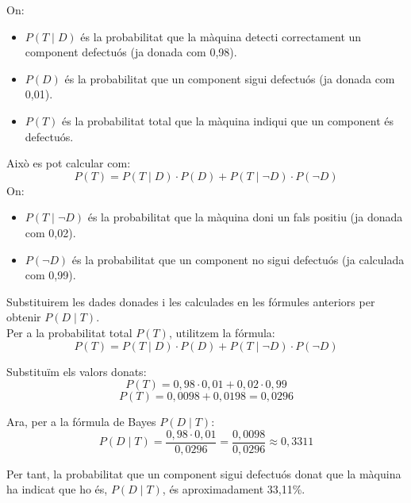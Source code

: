 \documentclass[12pt]{article}
\begin{document}
\begin{exemple} [title=] \noindent On:

\begin{itemize}
    \item $P(T \mid D)$ és la probabilitat que la màquina detecti correctament un component defectuós (ja donada com 0,98).
    \item $P(D)$ és la probabilitat que un component sigui defectuós (ja donada com 0,01).
    \item $P(T)$ és la probabilitat total que la màquina indiqui que un component és defectuós. 
\end{itemize}   
Això es pot calcular com:
    \[
    P(T) = P(T \mid D) \cdot P(D) + P(T \mid \neg D) \cdot P(\neg D)
    \]
    On:
    \begin{itemize}
    \item $P(T \mid \neg D)$ és la probabilitat que la màquina doni un fals positiu (ja donada com 0,02).
    \item $P(\neg D)$ és la probabilitat que un component no sigui defectuós (ja calculada com 0,99).
\end{itemize}

Substituirem les dades donades i les calculades en les fórmules anteriors per obtenir $P(D \mid T)$.\\

Per a la probabilitat total $P(T)$, utilitzem la fórmula: 
\[
P(T) = P(T \mid D) \cdot P(D) + P(T \mid \neg D) \cdot P(\neg D)
\]

Substituïm els valors donats: 
\[
P(T) = 0,98 \cdot 0,01 + 0,02 \cdot 0,99
\]
\[
P(T) = 0,0098 + 0,0198 = 0,0296
\]

Ara, per a la fórmula de Bayes $P(D \mid T)$: 
\[
P(D \mid T) = \frac{0,98 \cdot 0,01}{0,0296} = \frac{0,0098}{0,0296} \approx 0,3311
\]

Per tant, la probabilitat que un component sigui defectuós donat que la màquina ha indicat que ho és, $P(D \mid T)$, és aproximadament 33,11\%.
\end{exemple}
\end{document}

